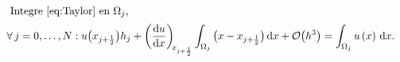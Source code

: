 \begin{frame}
	\frametitle{\secname}

	\begin{align}
		\shortintertext{
			Integre~\eqref{eq:Taylor} en $\Omega_{j}$,
		}
		\forall j=0,\dotsc,N:
		u\big(x_{j+\frac{1}{2}}\big)h_{j}+
		\diff{u}{x}[x_{j+\frac{1}{2}}]
		\int_{\Omega_{j}}
		\big(x-x_{j+\frac{1}{2}}\big)
		\dl x+
		\mathcal{O}\big(h^{3}\big) & =
		\int_{\Omega_{j}}
		u\left(x\right)
		\dl x.\notag

\end{align}
\end{frame}

